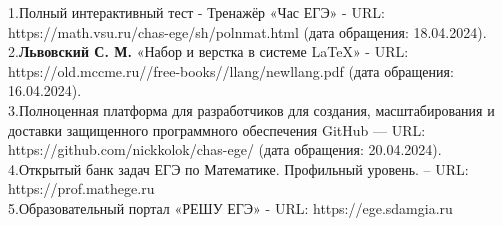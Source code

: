 1.\quad Полный интерактивный тест - Тренажёр «Час ЕГЭ» - URL: 
https://math.vsu.ru/chas-ege/sh/polnmat.html (дата обращения: 
18.04.2024).
\\2.\quad \textbf{Львовский С. М.} «Набор и верстка в системе LaTeX» - 
URL: https://old.mccme.ru//free-books//llang/newllang.pdf (дата 
обращения: 16.04.2024).
\\3.\quad Полноценная платформа для разработчиков для создания, 
масштабирования и доставки защищенного программного 
обеспечения GitHub — URL: https://github.com/nickkolok/chas-ege/ (дата 
обращения: 20.04.2024).  
\\4.\quad Открытый банк задач ЕГЭ по Математике. Профильный уровень. – 
URL: https://prof.mathege.ru
\\5.\quad Образовательный портал «РЕШУ ЕГЭ» - URL: https://ege.sdamgia.ru